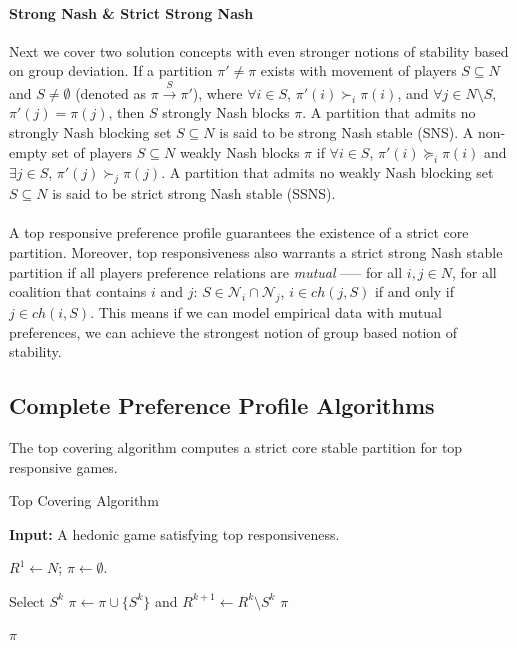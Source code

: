 \documentclass[letterpaper]{article} %
\theoremstyle{definition}
\begin{document}
\paragraph{Strong Nash \& Strict Strong Nash}
Next we cover two solution concepts with even stronger notions of stability based on group deviation. 
If a partition $\pi' \neq \pi$ exists with movement of players $S \subseteq N$ and $S \neq \emptyset$ (denoted as $\pi \xrightarrow{S} \pi'$), where $\forall i \in S$, $\pi'(i) \succ_i \pi(i)$, and $\forall j \in N\text{\textbackslash}S$, $\pi'(j) = \pi(j)$, then $S$ strongly Nash blocks $\pi$. 
A partition that admits no strongly Nash blocking set $S \subseteq N$ is said to be strong Nash stable (SNS). A non-empty set of players $S \subseteq N$ weakly Nash blocks $\pi$ if $\forall i \in S$, $\pi'(i) \succeq_i \pi(i)$ and $\exists j \in S$, $\pi'(j) \succ_j \pi(j)$. 
A partition that admits no weakly Nash blocking set $S \subseteq N$ is said to be strict strong Nash stable (SSNS).

\paragraph{} 
A top responsive preference profile guarantees the existence of a strict core partition. Moreover, top responsiveness also warrants a strict strong Nash stable partition if all players preference relations are {\it mutual} ––– for all $i, j \in N$, for all coalition that contains $i$ and $j$: $S \in \mathcal{N}_i \cap \mathcal{N}_j$, $i \in ch(j, S)$ if and only if $j \in ch(i, S)$. This means if we can model empirical data with mutual preferences, we can achieve the strongest notion of group based notion of stability.

\subsection{Complete Preference Profile Algorithms} \label{subsec:full_pref_algos}
The top covering algorithm computes a strict core stable partition for top responsive games.

\begin{algorithm}[htb]
  \caption{Top Covering Algorithm}
  \label{alg:top_covering}
  \textbf{Input:} A hedonic game satisfying top responsiveness.

  \begin{algorithmic}[1]
  \State $R^1 \leftarrow N$; $\pi \leftarrow \emptyset$.

    \State \label{top_cover:select} Select $S^k$
    \State \label{top_cover:remove} $\pi \leftarrow \pi \cup \lbrace S^k \rbrace$ and $R^{k+1} \leftarrow  R^k \setminus S^k$
      \State \Return $\pi$
    \EndIf
  \EndFor

  \State \Return $\pi$
 \end{algorithmic}
\end{algorithm}
\end{document}
